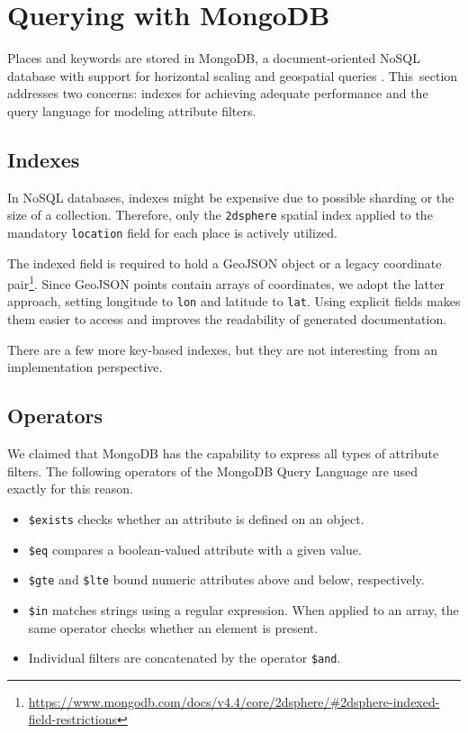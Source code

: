 \section{Querying with MongoDB}

Places and keywords are stored in MongoDB, a document-oriented NoSQL database with support for horizontal scaling and geospatial queries \cite{mongodb}. This~section addresses two concerns: indexes for achieving adequate performance and the query language for modeling attribute filters.

\subsection{Indexes}


In NoSQL databases, indexes might be expensive due to possible sharding or the size of a collection. Therefore, only the \texttt{2dsphere} spatial index applied to the mandatory \texttt{location} field for each place is actively utilized.

The indexed field is required to hold a GeoJSON object or a legacy coordinate pair\footnote{\href{https://www.mongodb.com/docs/v4.4/core/2dsphere/\#2dsphere-indexed-field-restrictions}{https://www.mongodb.com/docs/v4.4/core/2dsphere/\#2dsphere-indexed-field-restrictions}}. Since GeoJSON points contain arrays of coordinates, we adopt the latter approach, setting longitude to \texttt{lon} and latitude to \texttt{lat}. Using explicit fields makes them easier to access and improves the readability of generated doc\-u\-men\-ta\-tion.

There are a few more key-based indexes, but they are not interesting~from an implementation perspective.

\subsection{Operators}


We claimed that MongoDB has the capability to express all types of attribute filters. The following operators of the MongoDB Query Language are used exactly for this reason.

\begin{itemize}
\item \texttt{\$exists} checks whether an attribute is defined on an object.
\item \texttt{\$eq} compares a boolean-valued attribute with a given value.
\item \texttt{\$gte} and \texttt{\$lte} bound numeric attributes above and below, respectively.
\item \texttt{\$in} matches strings using a regular expression. When applied to an array, the same operator checks whether an element is present.
\item Individual filters are concatenated by the operator \texttt{\$and}.
\end{itemize}

